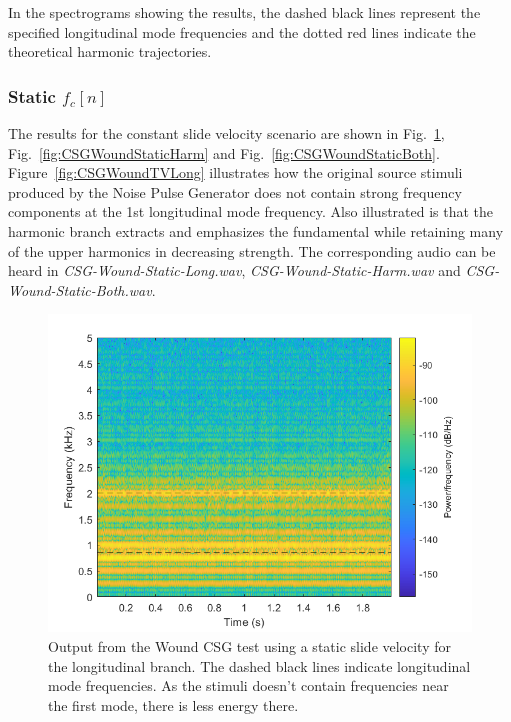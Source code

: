 \documentclass[../main.tex]{subfiles}
\begin{document}
In the spectrograms showing the results, the dashed black lines represent the specified longitudinal mode frequencies and the dotted red lines indicate the theoretical harmonic trajectories.

\subsubsection{Static $f_c[n]$}
The results for the constant slide velocity scenario are shown in Fig.~\ref{fig:CSGWoundStaticLong}, Fig.~\ref{fig:CSGWoundStaticHarm} and Fig.~\ref{fig:CSGWoundStaticBoth}. Figure~\ref{fig:CSGWoundTVLong} illustrates how the original source stimuli produced by the Noise Pulse Generator does not contain strong frequency components at the 1st longitudinal mode frequency. Also illustrated is that the harmonic branch extracts and emphasizes the fundamental while retaining many of the upper harmonics in decreasing strength. The corresponding audio can be heard in \emph{CSG-Wound-Static-Long.wav}, \emph{CSG-Wound-Static-Harm.wav} and \emph{CSG-Wound-Static-Both.wav}.

\begin{figure}[h!]
    \centering
    \includegraphics[scale=.58]{./images/plots/CSG_Wound_Static_Long.png}
    \caption{Output from the Wound CSG test using a static slide velocity for the longitudinal branch. The dashed black lines indicate longitudinal mode frequencies. As the stimuli doesn't contain frequencies near the first mode, there is less energy there.}
    \label{fig:CSGWoundStaticLong}
\end{figure}
\end{document}
